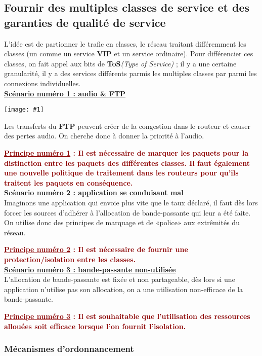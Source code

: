 \documentclass{article}
\newcommand{\dred}[1]{\textcolor{darkred}{\textbf{#1}}}
\newcommand{\imgR}[2]{\begin{center}\texttt{[image: \#1]}\end{center}}
\newcommand{\stitre}[1]{\noindent\textbf{\underline{#1}} \\}
\begin{document}
\subsection{Fournir des multiples classes de service et des garanties de qualité de service}

L'idée est de partionner le trafic en classes, le réseau traitant différemment les classes (un comme un service 
\textbf{VIP} et un service ordinaire). Pour différencier ces classes, on fait appel aux bits de 
\textbf{ToS}\textit{(Type of Service)} ; il y a une certaine granularité, il y a des services différents parmis 
les multiples classes par parmi les connexions individuelles. \\

\stitre{Scénario numéro 1 : audio \& \textbf{FTP}}

\imgR{CN_180.png}{300}

Les transferts du \textbf{FTP} peuvent créer de la congestion dans le routeur et causer des pertes audio. On 
cherche donc à donner la priorité à l'audio.

\noindent\dred{\underline{Principe numéro 1} : Il est nécessaire de marquer les paquets pour la distinction 
entre les paquets des différentes classes. Il faut également une nouvelle politique de traitement dans les 
routeurs pour qu'ils traitent les paquets en conséquence.} \\

\stitre{Scénario numéro 2 : application se conduisant mal}

Imaginons une application qui envoie plus vite que le taux déclaré, il faut dès lors forcer les sources 
d'adhérer à l'allocation de bande-passante qui leur a été faite. On utilise donc des principes de marquage et de 
«police» aux extrêmités du réseau.

\noindent\dred{\underline{Principe numéro 2} : Il est nécessaire de fournir une protection/isolation entre les 
classes.}  \\
\newpage
\stitre{Scénario numéro 3 : bande-passante non-utilisée}

L'allocation de bande-passante est fixée et non partageable, dès lors si une application n'utilise pas son 
allocation, on a une utilisation non-efficace de la bande-passante.

\noindent\dred{\underline{Principe numéro 3} : Il est souhaitable que l'utilisation des ressources allouées 
soit efficace lorsque l'on fournit l'isolation.}

\subsubsection{Mécanismes d'ordonnancement}
\end{document}
